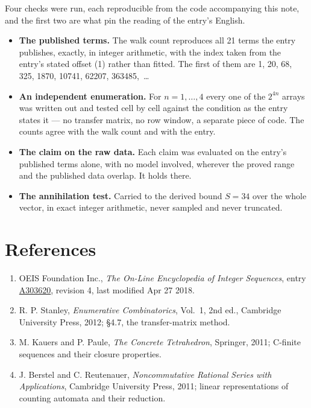 \documentclass[11pt]{article}
\theoremstyle{definition}
\begin{document}
Four checks were run, each reproducible from the code accompanying this note, and the first two are what pin the reading of the entry's English.

\begin{itemize}

\item {\bfseries The published terms.} The walk count reproduces all 21 terms the entry publishes, exactly, in integer arithmetic, with the index taken from the entry's stated offset (1) rather than fitted. The first of them are 1, 20, 68, 325, 1870, 10741, 62207, 363485,~\dots

\item {\bfseries An independent enumeration.} For $n = 1,\dots,4$ every one of the $2^{4n}$ arrays was written out and tested cell by cell against the condition as the entry states it --- no transfer matrix, no row window, a separate piece of code. The counts agree with the walk count and with the entry.

\item {\bfseries The claim on the raw data.} Each claim was evaluated on the entry's published terms alone, with no model involved, wherever the proved range and the published data overlap. It holds there.

\item {\bfseries The annihilation test.} Carried to the derived bound $S = 34$ over the whole vector, in exact integer arithmetic, never sampled and never truncated.

\end{itemize}

\section{References}

\begin{enumerate}

\item OEIS Foundation Inc., \emph{The On-Line Encyclopedia of Integer Sequences}, entry \href{https://oeis.org/A303620}{A303620}, revision 4, last modified Apr 27 2018.

\item R. P. Stanley, \emph{Enumerative Combinatorics}, Vol.~1, 2nd ed., Cambridge University Press, 2012; \S4.7, the transfer-matrix method.

\item M. Kauers and P. Paule, \emph{The Concrete Tetrahedron}, Springer, 2011; C-finite sequences and their closure properties.

\item J. Berstel and C. Reutenauer, \emph{Noncommutative Rational Series with Applications}, Cambridge University Press, 2011; linear representations of counting automata and their reduction.

\end{enumerate}
\end{document}
